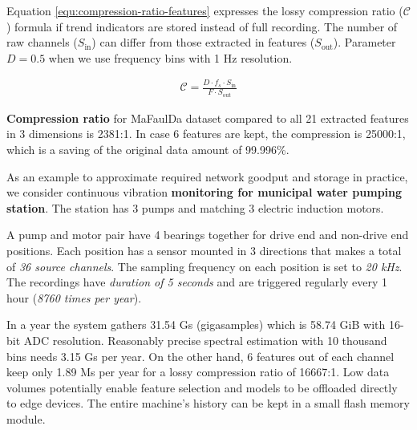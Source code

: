 Equation \ref{equ:compression-ratio-features} expresses the lossy compression ratio ($\mathcal{C}$) formula if trend indicators are stored instead of full recording. The number of raw channels ($S_{\mathrm{in}}$) can differ from those extracted in features ($S_{\mathrm{out}}$). Parameter $D = 0.5$ when we use frequency bins with 1 Hz resolution.

\begin{ceqn}\begin{align} \label{equ:compression-ratio-features}
\mathcal{C} = \frac{D \cdot f_s \cdot S_{\mathrm{in}}}{F \cdot S_{\mathrm{out}}}
\end{align}\end{ceqn}

\textbf{Compression ratio} for MaFaulDa dataset compared to all 21 extracted features in 3 dimensions is 2381:1. In case 6 features are kept, the compression is 25000:1, which is a saving of the original data amount of 99.996\%.

As an example to approximate required network goodput and storage in practice, we consider continuous vibration \textbf{monitoring for municipal water pumping station}. The station has 3 pumps and matching 3 electric induction motors. 

A pump and motor pair have 4 bearings together for drive end and non-drive end positions. Each position has a sensor mounted in 3 directions that makes a total of \emph{36 source channels}. The sampling frequency on each position is set to \emph{20 kHz}. The recordings have \emph{duration of 5 seconds} and are triggered regularly every 1 hour (\emph{8760 times per year}).

In a year the system gathers 31.54 Gs (gigasamples) which is 58.74 GiB with 16-bit ADC resolution. Reasonably precise spectral estimation with 10 thousand bins needs 3.15 Gs per year. On the other hand, 6 features out of each channel keep only 1.89 Ms per year for a lossy compression ratio of 16667:1. Low data volumes potentially enable feature selection and models to be offloaded directly to edge devices. The entire machine's history can be kept in a small flash memory module.

